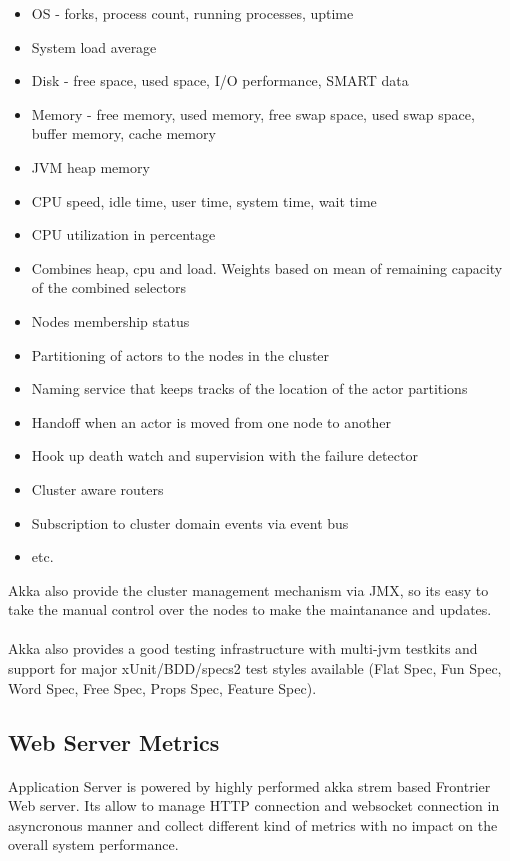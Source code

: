 \begin{itemize}
\item OS - forks, process count, running processes, uptime
\item System load average
\item Disk - free space, used space, I/O performance, SMART data
\item Memory - free memory, used memory, free swap space, used swap space, buffer memory, cache memory
\item JVM heap memory
\item CPU speed, idle time, user time, system time, wait time
\item CPU utilization in percentage
\item Combines  heap, cpu and load. Weights based on mean of remaining capacity of the combined selectors
\item Nodes membership status
\item Partitioning of actors to the nodes in the cluster
\item Naming service that keeps tracks of the location of the actor partitions
\item Handoff when an actor is moved from one node to another
\item Hook up death watch and supervision with the failure detector
\item Cluster aware routers
\item Subscription to cluster domain events via event bus
\item etc.
\end{itemize}

Akka also provide the cluster management mechanism via JMX, so its easy to take the manual control over the nodes to make the maintanance and updates.

\paragraph{}
Akka also provides a good testing infrastructure with multi-jvm testkits and support for major xUnit/BDD/specs2 test styles available
(Flat Spec, Fun Spec, Word Spec, Free Spec, Props Spec, Feature Spec).



\subsection*{Web Server Metrics}
\paragraph{}
Application Server is powered by highly performed akka strem based Frontrier Web server.
Its allow to manage HTTP connection and websocket connection in asyncronous manner and collect different kind of metrics with no impact on
the overall system performance.

